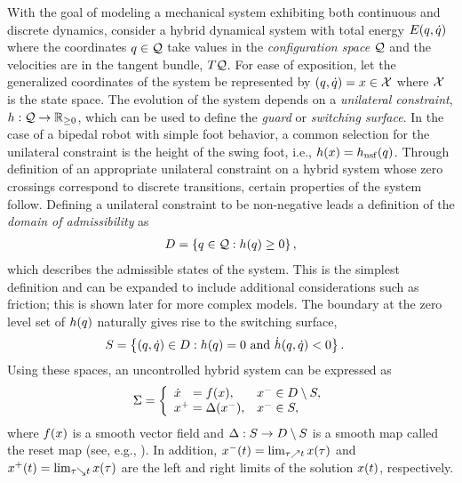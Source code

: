 With the goal of modeling a mechanical system exhibiting both continuous and
discrete dynamics, consider a hybrid dynamical system with total energy
$E(q, \dot{q})$ where the coordinates $q \in \mathcal{Q}$ take values in the {\em
  configuration space} $\mathcal{Q}$ and the velocities are in the tangent bundle,
$T\mathcal{Q}$.
%
For ease of exposition, let the generalized coordinates of the system be
represented by $(q, \dot{q}) = x \in \mathcal{X}$ where $\mathcal{X}$ is the state space.
%
The evolution of the system depends on a {\em unilateral constraint}, $h :
\mathcal{Q} \to \mathbb{R}_{\geq 0}$, which can be used to define the {\em guard} or {\em switching
  surface}.
%
In the case of a bipedal robot with simple foot behavior, a common selection for
the unilateral constraint is the height of the swing foot, i.e., $h(x) =
h_{\mathrm{nsf}}(q)$.
%
Through definition of an appropriate unilateral constraint on a hybrid system
whose zero crossings correspond to discrete transitions, certain properties of
the system follow.
%
Defining a unilateral constraint to be non-negative leads a definition of the
{\em domain of admissibility} as
%
\begin{align}
  \label{eq:domain}
  D = \left\{  q \in \mathcal{Q} : h(q) \geq 0 \right\},
\end{align}
%
which describes the admissible states of the system.
%
This is the simplest definition and can be expanded to include additional
considerations such as friction; this is shown later for more complex models.
%
The boundary at the zero level set of $h(q)$ naturally gives rise to the
switching surface,
%
\begin{align}
  \label{eq:guard}
  S &= \left\{ (q, \dot{q}) \in D  : h(q) = 0 \mbox{ and } {\dot {h}}(q, \dot{q}) <
    0 \right\}.
\end{align}
%
Using these spaces, an uncontrolled hybrid system can be expressed as
%
\begin{align}
  \HS = \left\{
  \begin{array}{l l}
    \dx\hphantom{^{+}} = \xf(\x), & \xm \in \D \setminus \Guard,\\
    \xp = \Delta(\xm), & \xm \in \Guard,
  \end{array}\right.
  \label{eq:hsys}
\end{align}
%
where $f(x)$ is a smooth vector field and $\Delta : S \to D \setminus
S$ is a smooth map called the reset map (see, e.g., \cite{Morris2005}).
%
In addition, $x^{-}(t) = \lim_{\tau \nearrow t} x(\tau)$ and $x^{+}(t) =
\lim_{\tau \searrow t} x(\tau)$ are the left and right limits of the solution
$x(t)$, respectively.
